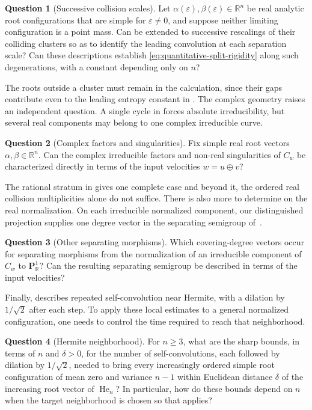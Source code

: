 \documentclass[12pt,reqno]{amsart}
\theoremstyle{definition}
\newtheorem{question}[question]{Question}
\theoremstyle{remark}
\newcommand{\R}{\mathbb R}
\newcommand{\He}{\operatorname{He}}
\newcommand{\eps}{\varepsilon}
\begin{document}
\begin{question}[Successive collision scales]
\label{que:successive-collision-scales}
Let \(\alpha(\eps),\beta(\eps)\in\R^n\) be real analytic root
configurations that are simple for \(\eps\ne0\), and suppose neither
limiting configuration is a point mass.  Can  be extended to successive rescalings of their colliding clusters so as to identify the leading convolution
at each separation scale? Can these descriptions establish \eqref{eq:quantitative-split-rigidity} along such degenerations, with a constant depending only on \(n\)?
\end{question}
The roots outside a cluster must remain in the calculation, since their gaps contribute even to the leading entropy constant in . The complex geometry raises an independent question. A single cycle in  forces absolute irreducibility, but several real components may belong to one complex irreducible curve.
\begin{question}[Complex factors and singularities]
\label{que:complex-geometry}
Fix simple real root vectors \(\alpha,\beta\in\R^n\).  Can the
complex irreducible factors and non-real singularities of \(C_w\)
be characterized directly in terms of the input velocities
\(w=u\oplus v\)?
\end{question}

The rational stratum in  gives one complete case and beyond it,
the ordered real collision multiplicities alone do not suffice. There is also more to determine on the real normalization.  On each irreducible normalized component, our distinguished projection supplies one degree vector in the separating semigroup of~\cite{KummerShaw20}.

\begin{question}[Other separating morphisms]
\label{que:separating-morphisms}
Which covering-degree vectors occur for separating morphisms from the normalization of an irreducible component of \(C_w\) to \(\mathbf P^1_\R\)?  Can the resulting separating semigroup be described in terms of the input velocities?
\end{question}

Finally,  describes repeated self-convolution near Hermite, with a dilation by \(1/\sqrt2\) after each step.  To apply these local estimates to a general normalized configuration, one needs to control the time required to reach that neighborhood.
\begin{question}[Hermite neighborhood]
\label{que:hermite-entry}
For \(n\geq3\), what are the sharp bounds, in terms of \(n\) and \(\delta>0\), for the number of self-convolutions, each followed by dilation by \(1/\sqrt2\), needed to bring every increasingly ordered simple root configuration of mean zero and variance \(n-1\) within Euclidean distance \(\delta\) of the increasing root vector of \(\He_n\)?  In particular, how do these bounds depend on \(n\) when the target neighborhood is chosen so that  applies?
\end{question}
\end{document}
